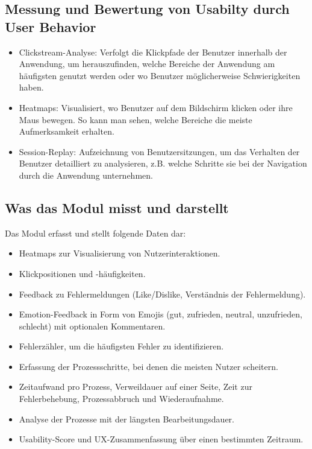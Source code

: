 \documentclass[12pt,oneside]{article}
\begin{document}
\subsection{Messung und Bewertung von Usabilty durch User Behavior}
\begin{itemize}
\item  Clickstream-Analyse: Verfolgt die Klickpfade der Benutzer innerhalb der Anwendung, um herauszufinden, welche Bereiche der Anwendung am häufigsten genutzt werden oder wo Benutzer möglicherweise Schwierigkeiten haben.
\item  Heatmaps: Visualisiert, wo Benutzer auf dem Bildschirm klicken oder ihre Maus bewegen. So kann man sehen, welche Bereiche die meiste Aufmerksamkeit erhalten.
\item  Session-Replay: Aufzeichnung von Benutzersitzungen, um das Verhalten der Benutzer detailliert zu analysieren, z.B. welche Schritte sie bei der Navigation durch die Anwendung unternehmen.
\end{itemize}



\subsection{Was das Modul misst und darstellt}

Das Modul erfasst und stellt folgende Daten dar:

\begin{itemize} 
\item Heatmaps zur Visualisierung von Nutzerinteraktionen.
 \item Klickpositionen und -häufigkeiten.
\item Feedback zu Fehlermeldungen (Like/Dislike, Verständnis der Fehlermeldung). 
\item Emotion-Feedback in Form von Emojis (gut, zufrieden, neutral, unzufrieden, schlecht) mit optionalen Kommentaren.
 \item Fehlerzähler, um die häufigsten Fehler zu identifizieren.
 \item Erfassung der Prozessschritte, bei denen die meisten Nutzer scheitern.
 \item Zeitaufwand pro Prozess, Verweildauer auf einer Seite, Zeit zur Fehlerbehebung, Prozessabbruch und Wiederaufnahme. 
\item Analyse der Prozesse mit der längsten Bearbeitungsdauer.
 \item Usability-Score und UX-Zusammenfassung über einen bestimmten Zeitraum. 
\end{itemize}
 
\end{document}
